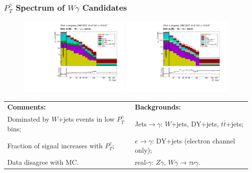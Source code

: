 \begin{frame}\frametitle{$P_T^{\gamma}$ Spectrum of $W\gamma$ Candidates}
  \begin{figure}[htb]
    \begin{center}
       \includegraphics[width=0.49\textwidth]{../figs/figs_v11/MUON_WGamma/PrepareYields/c_TotalDATAvsMC_Barrel__phoEt.pdf} \includegraphics[width=0.49\textwidth]{../figs/figs_v11/ELECTRON_WGamma/PrepareYields/c_TotalDATAvsMC_Barrel__phoEt.pdf} 
    \end{center}
  \end{figure}

\tiny
  \begin{table}[h]
     \tiny
     \begin{center}
     \begin{tabular}{|l|l|}
     \hline
     {\bfseries{Comments:}} &  {\color{white}\bfseries{ Backgrounds:}}\\ 
     Dominated by $W$+jets events in low $P_T^{\gamma}$ bins; &{\color{white}Jets$\rightarrow\gamma$: $W$+jets, DY+jets, $t\bar{t}$+jets;}\\
     Fraction of signal increases with $P_T^{\gamma}$; & {\color{white}$e\rightarrow\gamma$: DY+jets (electron channel only);}\\
     Data disagree with MC.          & {\color{white}real-$\gamma$: $Z\gamma$, $W\gamma\rightarrow\tau\nu\gamma$.}\\
     \hline
      \end{tabular}
      \end{center}
  \end{table}

\end{frame}


